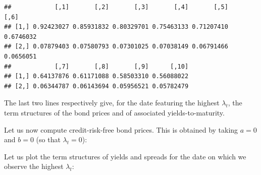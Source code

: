 \documentclass[
  12pt,
]{book}
\newenvironment{Shaded}{\begin{snugshade}}{\end{snugshade}}
\newcommand{\AttributeTok}[1]{\textcolor[rgb]{0.13,0.29,0.53}{#1}}
\newcommand{\DecValTok}[1]{\textcolor[rgb]{0.00,0.00,0.81}{#1}}
\newcommand{\FloatTok}[1]{\textcolor[rgb]{0.00,0.00,0.81}{#1}}
\newcommand{\FunctionTok}[1]{\textcolor[rgb]{0.13,0.29,0.53}{\textbf{#1}}}
\newcommand{\NormalTok}[1]{#1}
\newcommand{\OtherTok}[1]{\textcolor[rgb]{0.56,0.35,0.01}{#1}}
\newcommand{\SpecialCharTok}[1]{\textcolor[rgb]{0.81,0.36,0.00}{\textbf{#1}}}
\theoremstyle{definition}
\theoremstyle{definition}
\theoremstyle{definition}
\theoremstyle{definition}
\theoremstyle{remark}
\begin{document}
\begin{verbatim}
##            [,1]       [,2]       [,3]       [,4]       [,5]      [,6]
## [1,] 0.92423027 0.85931832 0.80329701 0.75463133 0.71207410 0.6746032
## [2,] 0.07879403 0.07580793 0.07301025 0.07038149 0.06791466 0.0656051
##            [,7]       [,8]       [,9]      [,10]
## [1,] 0.64137876 0.61171088 0.58503310 0.56088022
## [2,] 0.06344787 0.06143694 0.05956521 0.05782479
\end{verbatim}

The last two lines respectively give, for the date featuring the highest \(\lambda_t\), the term structures of the bond prices and of associated yields-to-maturity.

Let us now compute credit-risk-free bond prices. This is obtained by taking \(a=0\) and \(b=0\) (so that \(\lambda_t=0\)):

\begin{Shaded}
\end{Shaded}

Let us plot the term structures of yields and spreads for the date on which we observe the highest \(\lambda_t\):
\end{document}
